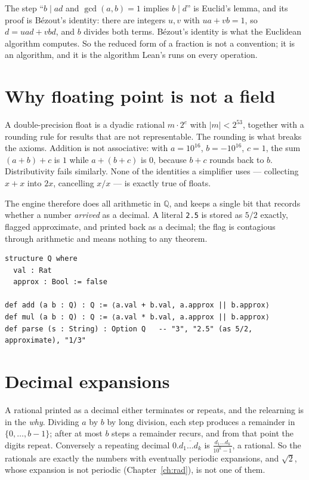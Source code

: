 The step ``$b \mid ad$ and $\gcd(a,b) = 1$ implies $b \mid d$'' is Euclid's lemma, and its proof
is Bézout's identity: there are integers $u, v$ with $ua + vb = 1$, so $d = uad + vbd$, and $b$
divides both terms. Bézout's identity is what the Euclidean algorithm computes. So the reduced
form of a fraction is not a convention; it is an algorithm, and it is the algorithm Lean's
 runs on every operation.

\section{Why floating point is not a field}

A double-precision float is a dyadic rational $m \cdot 2^e$ with $|m| < 2^{53}$, together with a
rounding rule for results that are not representable. The rounding is what breaks the axioms.
Addition is not associative: with $a = 10^{16}$, $b = -10^{16}$, $c = 1$, the sum $(a + b) + c$ is
$1$ while $a + (b + c)$ is $0$, because $b + c$ rounds back to $b$. Distributivity fails
similarly. None of the identities a simplifier uses --- collecting $x + x$ into $2x$, cancelling
$x/x$ --- is exactly true of floats.

The engine therefore does all arithmetic in $\mathbb{Q}$, and keeps a single bit that records
whether a number \emph{arrived} as a decimal. A literal \texttt{2.5} is stored as $5/2$ exactly,
flagged approximate, and printed back as a decimal; the flag is contagious through arithmetic
and means nothing to any theorem.

\begin{verbatim}
structure Q where
  val : Rat
  approx : Bool := false

def add (a b : Q) : Q := ⟨a.val + b.val, a.approx || b.approx⟩
def mul (a b : Q) : Q := ⟨a.val * b.val, a.approx || b.approx⟩
def parse (s : String) : Option Q   -- "3", "2.5" (as 5/2, approximate), "1/3"
\end{verbatim}

\section{Decimal expansions}

A rational printed as a decimal either terminates or repeats, and the relearning is in the
\emph{why}. Dividing $a$ by $b$ by long division, each step produces a remainder in
$\{0, \ldots, b-1\}$; after at most $b$ steps a remainder recurs, and from that point the digits
repeat. Conversely a repeating decimal $0.\overline{d_1 \ldots d_k}$ is $\frac{d_1 \ldots d_k}{10^k - 1}$,
a rational. So the rationals are exactly the numbers with eventually periodic expansions, and
$\sqrt 2$, whose expansion is not periodic (Chapter~\ref{ch:rad}), is not one of them.

